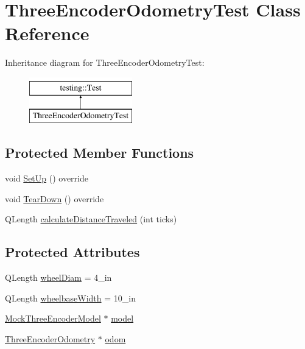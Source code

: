 \hypertarget{classThreeEncoderOdometryTest}{}\section{Three\+Encoder\+Odometry\+Test Class Reference}
\label{classThreeEncoderOdometryTest}
Inheritance diagram for Three\+Encoder\+Odometry\+Test\+:\begin{figure}[H]
\begin{center}
\leavevmode
\includegraphics[height=2.000000cm]{classThreeEncoderOdometryTest}
\end{center}
\end{figure}
\subsection*{Protected Member Functions}
\begin{DoxyCompactItemize}
\item 
void \mbox{\hyperlink{classThreeEncoderOdometryTest_ac8090894120fcfde281fc9dfc0d626f0}{Set\+Up}} () override
\item 
void \mbox{\hyperlink{classThreeEncoderOdometryTest_a48c1f1bd984ef4b2076a6f847d2b4457}{Tear\+Down}} () override
\item 
Q\+Length \mbox{\hyperlink{classThreeEncoderOdometryTest_a46a488d3ec003cf11bfc9fd70b98436a}{calculate\+Distance\+Traveled}} (int ticks)
\end{DoxyCompactItemize}
\subsection*{Protected Attributes}
\begin{DoxyCompactItemize}
\item 
Q\+Length \mbox{\hyperlink{classThreeEncoderOdometryTest_a45c513e2a1bb6b8fe69589630c2a4bfa}{wheel\+Diam}} = 4\+\_\+in
\item 
Q\+Length \mbox{\hyperlink{classThreeEncoderOdometryTest_aa34abdb61d22751692ea60bb8e02a2f5}{wheelbase\+Width}} = 10\+\_\+in
\item 
\mbox{\hyperlink{classMockThreeEncoderModel}{Mock\+Three\+Encoder\+Model}} $\ast$ \mbox{\hyperlink{classThreeEncoderOdometryTest_aaef56f1580395825d8b773a3b89b2c8c}{model}}
\item 
\mbox{\hyperlink{classokapi_1_1ThreeEncoderOdometry}{Three\+Encoder\+Odometry}} $\ast$ \mbox{\hyperlink{classThreeEncoderOdometryTest_a3862d29864883b7b47913ad442ed76a9}{odom}}
\end{DoxyCompactItemize}
